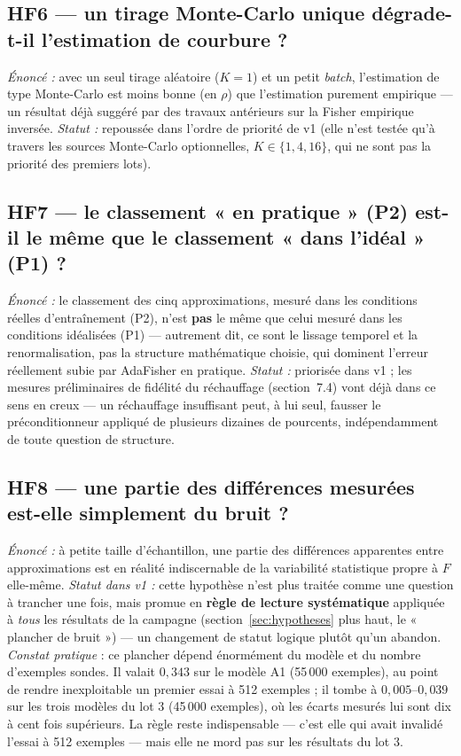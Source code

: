 \documentclass[11pt,a4paper]{article}
\newcommand{\eng}[1]{\emph{#1}}
\begin{document}
\subsection*{HF6 — un tirage Monte-Carlo unique dégrade-t-il l'estimation de courbure ?}
\textit{Énoncé :} avec un seul tirage aléatoire ($K=1$) et un petit \eng{batch}, l'estimation de type
Monte-Carlo est moins bonne (en $\rho$) que l'estimation purement empirique — un résultat déjà
suggéré par des travaux antérieurs sur la Fisher empirique inversée. \textit{Statut :} repoussée dans
l'ordre de priorité de v1 (elle n'est testée qu'à travers les sources Monte-Carlo optionnelles,
$K\in\{1,4,16\}$, qui ne sont pas la priorité des premiers lots).

\subsection*{HF7 — le classement « en pratique » (P2) est-il le même que le classement « dans l'idéal » (P1) ?}
\textit{Énoncé :} le classement des cinq approximations, mesuré dans les conditions réelles
d'entraînement (P2), n'est \textbf{pas} le même que celui mesuré dans les conditions idéalisées (P1)
— autrement dit, ce sont le lissage temporel et la renormalisation, pas la structure mathématique
choisie, qui dominent l'erreur réellement subie par AdaFisher en pratique. \textit{Statut :}
priorisée dans v1 ; les mesures préliminaires de fidélité du réchauffage (section~7.4) vont déjà dans
ce sens en creux — un réchauffage insuffisant peut, à lui seul, fausser le préconditionneur appliqué
de plusieurs dizaines de pourcents, indépendamment de toute question de structure.

\subsection*{HF8 — une partie des différences mesurées est-elle simplement du bruit ?}
\textit{Énoncé :} à petite taille d'échantillon, une partie des différences apparentes entre
approximations est en réalité indiscernable de la variabilité statistique propre à $F$ elle-même.
\textit{Statut dans v1 :} cette hypothèse n'est plus traitée comme une question à trancher une fois,
mais promue en \textbf{règle de lecture systématique} appliquée à \emph{tous} les résultats de la
campagne (section~\ref{sec:hypotheses} plus haut, le « plancher de bruit ») — un changement de
statut logique plutôt qu'un abandon. \textit{Constat pratique} : ce plancher dépend énormément du
modèle et du nombre d'exemples sondes. Il valait $0{,}343$ sur le modèle A1 (55\,000 exemples), au
point de rendre inexploitable un premier essai à 512 exemples ; il tombe à $0{,}005$--$0{,}039$ sur
les trois modèles du lot 3 (45\,000 exemples), où les écarts mesurés lui sont dix à cent fois
supérieurs. La règle reste indispensable — c'est elle qui avait invalidé l'essai à 512 exemples —
mais elle ne mord pas sur les résultats du lot 3.
\end{document}
